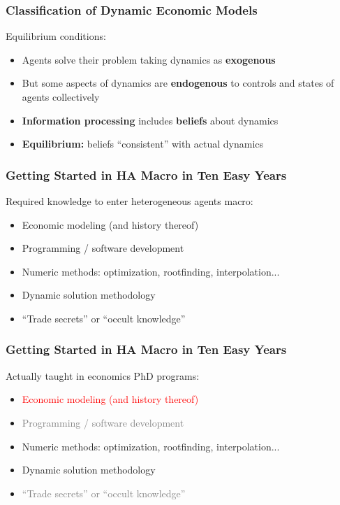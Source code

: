 \documentclass{beamer}
\newcommand{\bi}{\begin{itemize}}
\newcommand{\ei}{\end{itemize}}
\begin{document}
\begin{frame}
\frametitle{Classification of Dynamic Economic Models}


\begin{block}{Equilibrium conditions:}
\bi
\item Agents solve their problem taking dynamics as \textbf{exogenous}

\item But some aspects of dynamics are \textbf{endogenous} to controls and states of agents collectively

\item \textbf{Information processing} includes \textbf{beliefs} about dynamics

\item \textbf{Equilibrium:} beliefs ``consistent'' with actual dynamics

\ei
\end{block}

\end{frame}



\begin{frame}
\frametitle{Getting Started in HA Macro in Ten Easy Years}

\begin{block}{Required knowledge to enter heterogeneous agents macro:}
\bi
\item Economic modeling (and history thereof)

\item Programming / software development

\item Numeric methods: optimization, rootfinding, interpolation...

\item Dynamic solution methodology

\item ``Trade secrets'' or ``occult knowledge''
\ei
\end{block}

\end{frame}


\begin{frame}
\frametitle{Getting Started in HA Macro in Ten Easy Years}

\begin{block}{Actually taught in economics PhD programs:}
\bi
\item \textcolor{red}{Economic modeling (and history thereof)}

\item \textcolor{gray}{Programming / software development}

\item Numeric methods: optimization, rootfinding, interpolation...

\item Dynamic solution methodology

\item \textcolor{gray}{``Trade secrets'' or ``occult knowledge''}
\ei
\end{block}

\end{frame}
\end{document}
